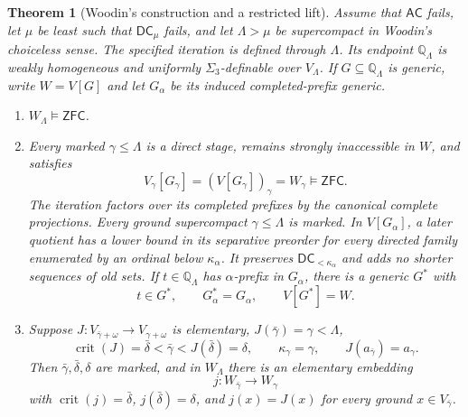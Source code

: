 \documentclass[11pt,a4paper]{amsart}
\newcommand{\AC}{\mathsf{AC}}
\newcommand{\ZFC}{\mathsf{ZFC}}
\newcommand{\DC}{\mathsf{DC}}
\newcommand{\crit}{\operatorname{crit}}
\theoremstyle{plain}
\newtheorem{theorem}{Theorem}[section]
\theoremstyle{definition}
\theoremstyle{remark}
\begin{document}
\begin{theorem}[Woodin's construction and a restricted lift]\label{thm:Woodin-forcing}
Assume that $\AC$ fails, let $\mu$ be least such that $\DC_\mu$ fails,
and let $\Lambda>\mu$ be supercompact in Woodin's choiceless sense.
The specified iteration is defined through $\Lambda$.
Its endpoint $\mathbb Q_\Lambda$ is weakly homogeneous and uniformly
$\Sigma_3$-definable over $V_\Lambda$.
If $G\subseteq\mathbb Q_\Lambda$ is generic, write $W=V[G]$ and let
$G_\alpha$ be its induced completed-prefix generic.
\begin{enumerate}
\item $W_\Lambda\models\ZFC$.
\item Every marked $\gamma\leq\Lambda$ is a direct stage, remains
strongly inaccessible in $W$, and satisfies
\[
V_\gamma[G_\gamma]=(V[G_\gamma])_\gamma=W_\gamma\models\ZFC.
\]
The iteration factors over its completed prefixes by the canonical
complete projections.  Every ground supercompact
$\gamma\leq\Lambda$ is marked.  In $V[G_\alpha]$, a later quotient
has a lower bound in its separative preorder for every directed
family enumerated by an ordinal below $\kappa_\alpha$.
It preserves $\DC_{<\kappa_\alpha}$ and adds no shorter sequences
of old sets.
If $t\in\mathbb Q_\Lambda$ has $\alpha$-prefix in $G_\alpha$,
there is a generic $G^*$ with
\[
t\in G^*,\qquad G_\alpha^*=G_\alpha,\qquad V[G^*]=W.
\]
\item Suppose $J:V_{\bar\gamma+\omega}\to V_{\gamma+\omega}$ is
elementary, $J(\bar\gamma)=\gamma<\Lambda$,
\[
\crit(J)=\bar\delta<\bar\gamma<J(\bar\delta)=\delta,
\qquad \kappa_\gamma=\gamma,\qquad J(a_{\bar\gamma})=a_\gamma.
\]
Then $\bar\gamma,\bar\delta,\delta$ are marked, and in $W_\Lambda$
there is an elementary embedding
\[
j:W_{\bar\gamma}\longrightarrow W_\gamma
\]
with $\crit(j)=\bar\delta$, $j(\bar\delta)=\delta$, and
$j(x)=J(x)$ for every ground $x\in V_{\bar\gamma}$.
\end{enumerate}
\end{theorem}
\end{document}
